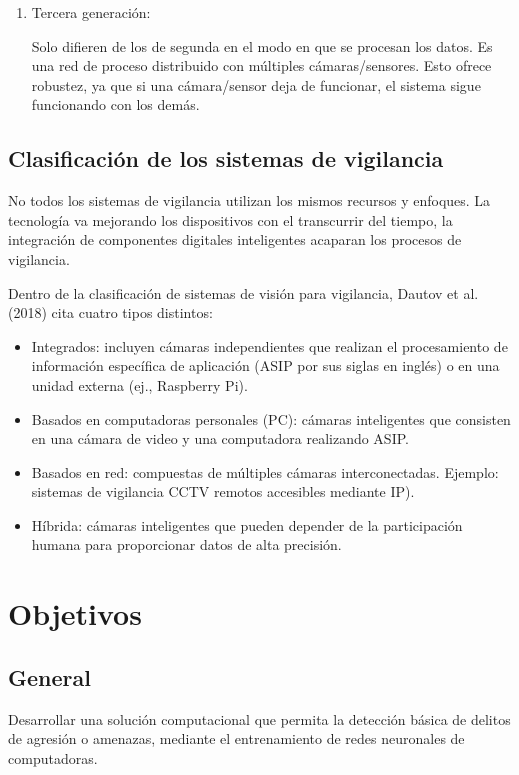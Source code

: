 \documentclass[a4paper,12pt,oneside,spanish]{book}
\begin{document}
\begin{enumerate}
	\item Tercera generación: \par
	Solo difieren de los de segunda en el modo en que se procesan los datos. Es una red de proceso distribuido con múltiples cámaras/sensores. Esto ofrece robustez, ya que si una cámara/sensor deja de funcionar, el sistema sigue funcionando con los demás.
\end{enumerate}



\subsection{Clasificación de los sistemas de vigilancia}

No todos los sistemas de vigilancia utilizan los mismos recursos y enfoques. La tecnología va mejorando los dispositivos con el transcurrir del tiempo, la integración de componentes digitales inteligentes acaparan los procesos de vigilancia. \par

Dentro de la clasificación de sistemas de visión para vigilancia, Dautov et al. (2018) cita cuatro tipos distintos:
\begin{itemize}
	\setlength\itemsep{-1.2em}
	\item Integrados: incluyen cámaras independientes que realizan el procesamiento de información específica de aplicación (ASIP por sus siglas en inglés) o en una unidad externa (ej., Raspberry Pi).\\	
	\item Basados en computadoras personales (PC): cámaras inteligentes que consisten en una cámara de video y una computadora  realizando ASIP.\\	
	\item Basados en red: compuestas de múltiples cámaras interconectadas. Ejemplo: sistemas de vigilancia CCTV remotos accesibles mediante IP).\\	
	\item Híbrida: cámaras inteligentes que pueden depender de la participación humana para proporcionar datos de alta precisión.\\	
\end{itemize}
 
\section{Objetivos}
\subsection{General}
Desarrollar una solución computacional que permita la detección básica de delitos de agresión o amenazas, mediante el entrenamiento de redes neuronales de computadoras.\par 
\end{document}
